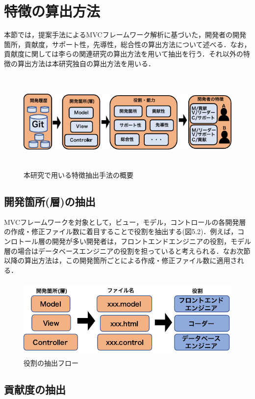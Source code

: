 \documentclass{funthesis}
\begin{document}
\section{特徴の算出方法}
本節では，提案手法によるMVCフレームワーク解析に基づいた，開発者の開発箇所，貢献度，サポート性，先導性，総合性の算出方法について述べる．なお，貢献度に関しては李ら\cite{risyo}の関連研究の算出方法を用いて抽出を行う．それ以外の特徴の算出方法は本研究独自の算出方法を用いる．
\begin{figure}[!t]
\centering  %
\includegraphics[clip,width=16cm,height=5cm]{figures/overview.pdf}
  \caption{本研究で用いる特徴抽出手法の概要}    \label{sample}
\end{figure}

\subsection{開発箇所(層)の抽出}

MVCフレームワークを対象として，ビュー，モデル，コントロールの各開発層の作成・修正ファイル数に着目することで役割を抽出する(図5.2)．例えば，コンロトール層の開発が多い開発者は，フロントエンドエンジニアの役割，モデル層の場合はデータベースエンジニアの役割を担っていると考えられる．なお次節以降の算出方法は，この開発箇所ごとによる作成・修正ファイル数に適用される．
\begin{figure}[!t]
\centering  %
\includegraphics[clip,width=12cm,height=4cm]{figures/role.pdf}
  \caption{役割の抽出フロー}    \label{sample}
\end{figure}

\subsection{貢献度の抽出}
\end{document}
